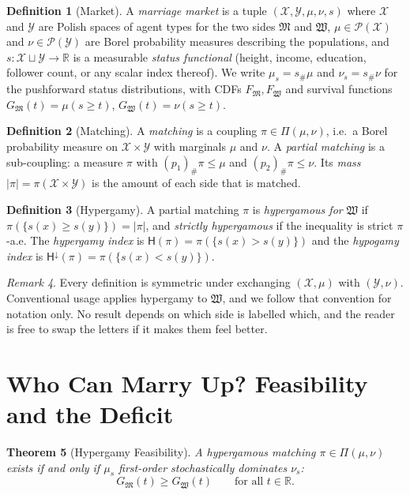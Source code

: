 \documentclass[11pt]{article}
\let\oldsection\section
\renewcommand{\section}{\Needspace{0.25\textheight}\oldsection}
\newtheorem{theorem}{Theorem}[section]
\theoremstyle{definition}
\newtheorem{definition}[theorem]{Definition}
\theoremstyle{remark}
\newtheorem{remark}[theorem]{Remark}
\newcommand{\M}{\mathfrak{M}}
\newcommand{\W}{\mathfrak{W}}
\newcommand{\X}{\mathcal{X}}
\newcommand{\Y}{\mathcal{Y}}
\newcommand{\R}{\mathbb{R}}
\newcommand{\Hy}{\mathsf{H}}
\begin{document}
\begin{definition}[Market]
  A \emph{marriage market} is a tuple $(\X,\Y,\mu,\nu,s)$ where $\X$
  and $\Y$ are Polish spaces of agent types for the two sides $\M$
  and $\W$, $\mu\in\mathcal{P}(\X)$ and $\nu\in\mathcal{P}(\Y)$ are
  Borel probability measures describing the populations, and
  $s:\X\sqcup\Y\to\R$ is a measurable \emph{status functional}
  (height, income, education, follower count, or any scalar index
  thereof). We write $\mu_s = s_\#\mu$ and $\nu_s = s_\#\nu$ for the
  pushforward status distributions, with CDFs $F_\M, F_\W$ and
  survival functions $G_\M(t) = \mu(s\ge t)$, $G_\W(t) = \nu(s\ge t)$.
\end{definition}

\begin{definition}[Matching]
  A \emph{matching} is a coupling $\pi\in\Pi(\mu,\nu)$, i.e.\ a Borel
  probability measure on $\X\times\Y$ with marginals $\mu$ and $\nu$.
  A \emph{partial matching} is a sub-coupling: a measure $\pi$ with
  $(p_1)_\#\pi\le\mu$ and $(p_2)_\#\pi\le\nu$. Its \emph{mass} $|\pi|
  = \pi(\X\times\Y)$ is the amount of each side that is matched.
\end{definition}

\begin{definition}[Hypergamy]
  A partial matching $\pi$ is \emph{hypergamous for} $\W$ if
  $\pi(\{s(x)\ge s(y)\}) = |\pi|$, and \emph{strictly hypergamous} if
  the inequality is strict $\pi$-a.e. The \emph{hypergamy index} is
  $\Hy(\pi) = \pi(\{s(x) > s(y)\})$ and the \emph{hypogamy index} is
  $\Hy^{\downarrow}(\pi) = \pi(\{s(x) < s(y)\})$.
\end{definition}

\begin{remark}
  Every definition is symmetric under exchanging $(\X,\mu)$ with
  $(\Y,\nu)$. Conventional usage applies hypergamy to $\W$, and we
  follow that convention for notation only. No result depends on
  which side is labelled which, and the reader is free to swap the
  letters if it makes them feel better.
\end{remark}

\section{Who Can Marry Up? Feasibility and the Deficit}

\begin{theorem}[Hypergamy Feasibility]\label{thm:feas}
  A hypergamous matching $\pi\in\Pi(\mu,\nu)$ exists if and only if
  $\mu_s$ first-order stochastically dominates $\nu_s$:
  \begin{equation}\label{eq:fsd}
    G_\M(t) \ge G_\W(t) \qquad \text{for all } t\in\R.
  \end{equation}
\end{theorem}
\end{document}
